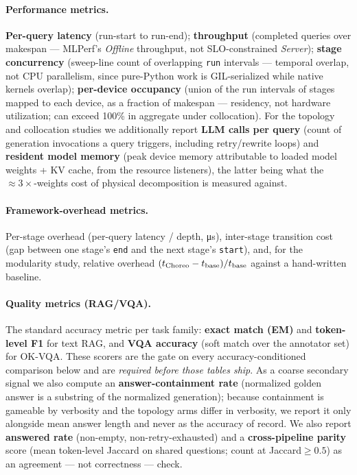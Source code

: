 \paragraph{Performance metrics.} \textbf{Per-query latency} (run-start to
run-end); \textbf{throughput} (completed queries over makespan --- MLPerf's
\emph{Offline} throughput, not SLO-constrained \emph{Server});
\textbf{stage concurrency} (sweep-line count of overlapping \texttt{run}
intervals --- temporal overlap, not CPU parallelism, since pure-Python work
is GIL-serialized while native kernels overlap); \textbf{per-device
occupancy} (union of the run intervals of stages mapped to each device, as
a fraction of makespan --- residency, not hardware utilization; can exceed
100\% in aggregate under collocation). For the topology and collocation
studies we additionally report \textbf{LLM calls per query} (count of
generation invocations a query triggers, including retry/rewrite loops)
and \textbf{resident model memory} (peak device memory attributable to
loaded model weights + KV cache, from the resource listeners), the latter
being what the ${\approx}3\times$-weights cost of physical decomposition is
measured against.

\paragraph{Framework-overhead metrics.} Per-stage overhead (per-query
latency / depth, \si{\micro\second}), inter-stage transition cost (gap
between one stage's \texttt{end} and the next stage's \texttt{start}),
and, for the modularity study, relative overhead
$(t_{\text{Choreo}}-t_{\text{base}})/t_{\text{base}}$ against a
hand-written baseline.

\paragraph{Quality metrics (RAG/VQA).} The standard accuracy metric per
task family: \textbf{exact match (EM)} and \textbf{token-level F1} for
text RAG, and \textbf{VQA accuracy} (soft match over the annotator set)
for OK-VQA. These scorers are the gate on every accuracy-conditioned
comparison below and are \emph{required before those tables ship}.
As a coarse secondary signal we also compute an \textbf{answer-containment
rate} (normalized golden answer is a substring of the normalized
generation); because containment is gameable by verbosity and the topology
arms differ in verbosity, we report it only alongside mean answer length
and never as the accuracy of record. We also report \textbf{answered rate}
(non-empty, non-retry-exhausted) and a \textbf{cross-pipeline parity}
score (mean token-level Jaccard on shared questions; count at
Jaccard${\geq}0.5$) as an agreement --- not correctness --- check.

